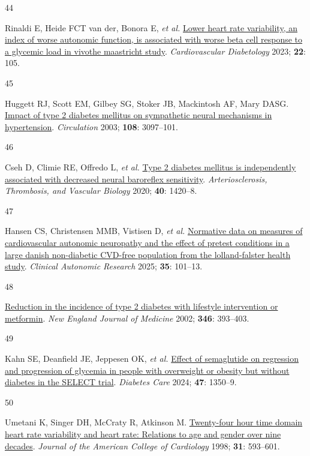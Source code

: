 \documentclass[
  a4paper,
  headsepline=true,
  open=any]{scrbook}
\newlength{\cslhangindent}
\newlength{\csllabelwidth}
\newlength{\cslentryspacingunit} %
\newenvironment{CSLReferences}[2] %
 {%
  \setlength{\parindent}{0pt}
  \ifodd #1
  \let\oldpar\par
  \def\par{\hangindent=\cslhangindent\oldpar}
  \fi
  \setlength{\parskip}{#2\cslentryspacingunit}
 }%
 {}
\newcommand{\CSLLeftMargin}[1]{\parbox[t]{\csllabelwidth}{#1}}
\newcommand{\CSLRightInline}[1]{\parbox[t]{\linewidth - \csllabelwidth}{#1}\break}
\begin{document}
\begin{CSLReferences}{0}{0}
\leavevmode{}%
\CSLLeftMargin{44 }%
\CSLRightInline{Rinaldi E, Heide FCT van der, Bonora E, \emph{et al.}
\href{https://doi.org/10.1186/s12933-023-01837-0}{Lower heart rate
variability, an index of worse autonomic function, is associated with
worse beta cell response to a glycemic load in vivo{\textemdash}the
maastricht study}. \emph{Cardiovascular Diabetology} 2023; \textbf{22}:
105.}

\leavevmode{}%
\CSLLeftMargin{45 }%
\CSLRightInline{Huggett RJ, Scott EM, Gilbey SG, Stoker JB, Mackintosh
AF, Mary DASG.
\href{https://doi.org/10.1161/01.CIR.0000103123.66264.FE}{Impact of type
2 diabetes mellitus on sympathetic neural mechanisms in hypertension}.
\emph{Circulation} 2003; \textbf{108}: 3097--101.}

\leavevmode{}%
\CSLLeftMargin{46 }%
\CSLRightInline{Cseh D, Climie RE, Offredo L, \emph{et al.}
\href{https://doi.org/10.1161/ATVBAHA.120.314102}{Type 2 diabetes
mellitus is independently associated with decreased neural baroreflex
sensitivity}. \emph{Arteriosclerosis, Thrombosis, and Vascular Biology}
2020; \textbf{40}: 1420--8.}

\leavevmode{}%
\CSLLeftMargin{47 }%
\CSLRightInline{Hansen CS, Christensen MMB, Vistisen D, \emph{et al.}
\href{https://doi.org/10.1007/s10286-024-01069-6}{Normative data on
measures of cardiovascular autonomic neuropathy and the effect of
pretest conditions in a large danish non-diabetic CVD-free population
from the lolland-falster health study}. \emph{Clinical Autonomic
Research} 2025; \textbf{35}: 101--13.}

\leavevmode{}%
\CSLLeftMargin{48 }%
\CSLRightInline{\href{https://doi.org/10.1056/NEJMoa012512}{Reduction in
the incidence of type 2 diabetes with lifestyle intervention or
metformin}. \emph{New England Journal of Medicine} 2002; \textbf{346}:
393--403.}

\leavevmode{}%
\CSLLeftMargin{49 }%
\CSLRightInline{Kahn SE, Deanfield JE, Jeppesen OK, \emph{et al.}
\href{https://doi.org/10.2337/dc24-0491}{Effect of semaglutide on
regression and progression of glycemia in people with overweight or
obesity but without diabetes in the SELECT trial}. \emph{Diabetes Care}
2024; \textbf{47}: 1350--9.}

\leavevmode{}%
\CSLLeftMargin{50 }%
\CSLRightInline{Umetani K, Singer DH, McCraty R, Atkinson M.
\href{https://doi.org/10.1016/S0735-1097(97)00554-8}{Twenty-four hour
time domain heart rate variability and heart rate: Relations to age and
gender over nine decades}. \emph{Journal of the American College of
Cardiology} 1998; \textbf{31}: 593--601.}


\end{CSLReferences}
\end{document}
